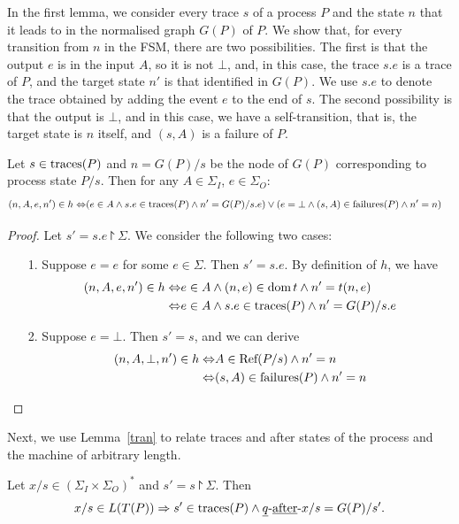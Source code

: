 In the first lemma, we consider every trace $s$ of a process $P$ and the
state $n$ that it leads to in the normalised graph $G(P)$ of $P$. We show
that, for every transition from $n$ in the FSM, there are two possibilities.
The first is that the output $e$ is in the input $A$, so it is not $\bot$,
and, in this case, the trace $s.e$ is a trace of $P$, and the target state
$n'$ is that identified in $G(P)$. We use $s.e$ to denote the trace obtained
by adding the event $e$ to the end of $s$. The second possibility is that the
output is $\bot$, and in this case, we have a self-transition, that is, the
target state is $n$ itself, and $(s,A)$ is a failure of $P$.
%
\begin{lemma}\label{tran}
Let $s\in \text{traces}(P)$ and $n=G(P)/s$ be the node of $G(P)$ corresponding to
process state $P/s$. Then for any $A \in \Sigma_I$, $e\in \Sigma_O\colon$
\begin{align*}
  (n,A,e,n')\in h\Leftrightarrow & (e\in A\wedge s.e\in \text{traces}(P)\wedge n'=G(P)/s.e)\vee(e=\bot \wedge (s,A)\in {\text {\rm failures}}(P)\wedge n'=n)\end{align*}
\end{lemma}
\begin{proof}
  Let $s'=s.e\project \Sigma$.
  We consider the following two cases:
  \begin{itemize}
    \item[1.] Suppose $e=e$ for some $e\in \Sigma$. Then $s'=s.e$. By definition of $h$, we have
    \begin{align*}
      (n,A,e,n')\in h\Leftrightarrow & e\in A\wedge (n,e)\in {\text{\rm dom}}\, t\wedge n'=t(n,e)
      \\
      \Leftrightarrow& e\in A \wedge s.e\in \text{traces}(P)\wedge n'=G(P)/s.e
    \end{align*}
    \item[2.] Suppose $e=\bot$. Then $s'=s$, and we can derive
    \begin{align*}
      (n,A,\bot,n')\in h\Leftrightarrow & A \in {\text {\rm Ref}}(P/s)\wedge n'=n
      \\
      \Leftrightarrow & (s,A) \in {\text {\rm failures}}(P)\wedge n'=n
    \end{align*}
  \end{itemize}
\end{proof}
%
%
Next, we use Lemma~\ref{tran} to relate traces and after states
of the process and the machine of arbitrary length.
%
\begin{lemma}\label{trac}
  Let $x/s \in (\Sigma_I\times\Sigma_O)^*$ and $s' = s\project \Sigma$.
  Then
  \[
    x/s \in L(T(P))\Rightarrow s' \in \text{traces}(P) \wedge \underline q \text{-\underline{after}-} x/s = G(P)/s'.\]
\end{lemma}
